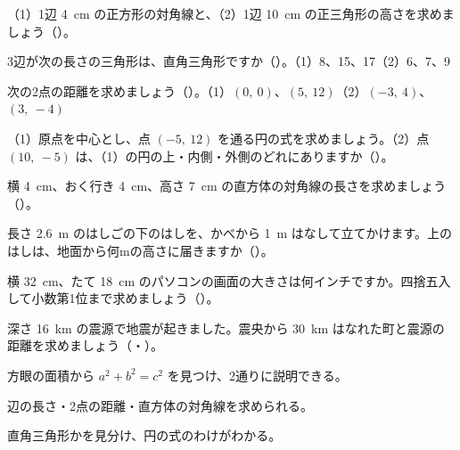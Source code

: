 \bkproblem （1）1辺 \qty{4}{cm} の正方形の対角線と、（2）1辺 \qty{10}{cm} の正三角形の高さを求めましょう（）。

\bkproblem 3辺が次の長さの三角形は、直角三角形ですか（）。\quad（1）8、15、17\quad（2）6、7、9

\bkproblem 次の2点の距離を求めましょう（）。\quad（1）$(0,\ 0)$、$(5,\ 12)$\quad（2）$(-3,\ 4)$、$(3,\ -4)$

\bkproblem （1）原点を中心とし、点 $(-5,\ 12)$ を通る円の式を求めましょう。（2）点 $(10,\ -5)$ は、（1）の円の上・内側・外側のどれにありますか（）。

\bkproblem 横 \qty{4}{cm}、おく行き \qty{4}{cm}、高さ \qty{7}{cm} の直方体の対角線の長さを求めましょう（）。


\bkproblem 長さ \qty{2.6}{m} のはしごの下のはしを、かべから \qty{1}{m} はなして立てかけます。上のはしは、地面から何mの高さに届きますか（）。

\bkproblem 横 \qty{32}{cm}、たて \qty{18}{cm} のパソコンの画面の大きさは何インチですか。四捨五入して小数第1位まで求めましょう（）。

\bkproblem 深さ \qty{16}{km} の震源で地震が起きました。震央から \qty{30}{km} はなれた町と震源の距離を求めましょう（・）。

\begin{furikaeri}
\begin{checklist}
\item 方眼の面積から $a^2+b^2=c^2$ を見つけ、2通りに説明できる。
\item 辺の長さ・2点の距離・直方体の対角線を求められる。
\item 直角三角形かを見分け、円の式のわけがわかる。
\end{checklist}
\end{furikaeri}

